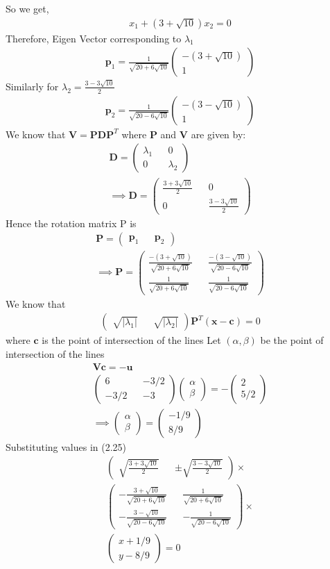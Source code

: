 \documentclass[journal,13pt,twocolumn]{IEEEtran}
\newcommand{\myvec}[1]{\ensuremath{\begin{pmatrix}#1\end{pmatrix}}}
\renewcommand{\vec}[1]{\mathbf{#1}}
\begin{document}
So we get,
\begin{align}
x_1 + (3+\sqrt{10})x_2 = 0
\end{align}
Therefore, Eigen Vector corresponding to $\lambda_1$
\begin{align}
\vec{p}_1 =\frac{1}{\sqrt{20+6\sqrt{10}}} \myvec{-(3+\sqrt{10}) \\ 1}
\end{align}
Similarly for $\lambda_2 = \frac{3-3\sqrt{10}}{2}$
\begin{align}
\vec{p}_2 =\frac{1}{\sqrt{20-6\sqrt{10}}} \myvec{-(3-\sqrt{10}) \\ 1}
\end{align}
We know that $\vec{V} = \vec{P}\vec{D}\vec{P}^T$ where $\vec{P}$ and $\vec{V}$ are given by:
\begin{align}
\vec{D} = \myvec{\lambda_1 && 0\\ 0 && \lambda_2}\\
\implies \vec{D} = \myvec{\frac{3+3\sqrt{10}}{2} && 0\\ 0 &&\frac{3-3\sqrt{10}}{2} }
\end{align}
Hence the rotation matrix P is
\begin{align}
\vec{P} = \myvec{\vec{p}_1 && \vec{p}_2}\\
\implies \vec{P} = \myvec{\frac{-(3+\sqrt{10})}{\sqrt{20+6\sqrt{10}}} && \frac{-(3-\sqrt{10})}{\sqrt{20-6\sqrt{10}}} \\ \frac{1}{\sqrt{20+6\sqrt{10}}} && \frac{1}{\sqrt{20-6\sqrt{10}}}}
\end{align}
We know that 
\begin{align}
\myvec{\sqrt{|\lambda_1|} && \sqrt{|\lambda_2|}}\vec{P}^T(\vec{x}-\vec{c}) = 0
\end{align}
where $\vec{c}$ is the point of intersection of the lines 
Let $(\alpha,\beta)$ be the point of intersection of the lines 
\begin{equation}
\begin{split}
\vec{V}\vec{c} = -\vec{u}\\
\myvec{6 && -3/2\\-3/2 && -3} \myvec{\alpha \\ \beta} = -\myvec{2 \\ 5/2}\\
\implies \myvec{\alpha \\ \beta} = \myvec{-1/9 \\ 8/9}
\end{split}
\end{equation}
Substituting values in (2.25)
\begin{equation} 
\begin{split}
\myvec{ \sqrt{\frac{3+3\sqrt{10}}{2}} && \pm\sqrt{\frac{3-3\sqrt{10}}{2}}} \times \\
\myvec{ -\frac{3+\sqrt{10}}{\sqrt{20+6\sqrt{10}}} && \frac{1}{\sqrt{20+6\sqrt{10}}} \\ -\frac{3-\sqrt{10}}{\sqrt{20-6\sqrt{10}}} && -\frac{1}{\sqrt{20-6\sqrt{10}}}} \times \\
\myvec{x+1/9 \\ y-8/9}  = 0
\end{split}
\end{equation}
\end{document}
